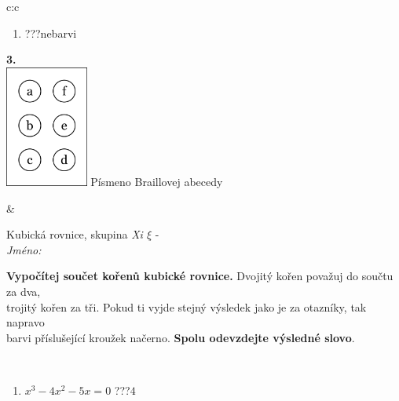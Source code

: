 \documentclass[10pt]{report}
\begin{document}
\begin{tabular}{c:c}
\begin{minipage}[c][104.5mm][t]{0.5\linewidth}
\begin{center}
\begin{minipage}{0.79\linewidth}
\begin{center}
\begin{varwidth}{\linewidth}
\begin{enumerate}
\item \quad \dotfill\; ???\;\dotfill \quad nebarvi
\end{enumerate}
\end{varwidth}
\end{center}
\end{minipage}
\begin{minipage}{0.20\linewidth}
\begin{center}
{\Huge\bfseries 3.} \\[2mm]
\includegraphics[height=40mm]{../images/braille.png}
{\small Písmeno Braillovej abecedy}
\end{center}
\end{minipage}
\end{center}
\end{minipage}
&
\begin{minipage}[c][104.5mm][t]{0.5\linewidth}
\begin{center}
\vspace{7mm}
{\huge Kubická rovnice, skupina \textit{Xi $\xi$} -}\\[5mm]
\textit{Jméno:}\phantom{xxxxxxxxxxxxxxxxxxxxxxxxxxxxxxxxxxxxxxxxxxxxxxxxxxxxxxxxxxxxxxxxx}\\[5mm]
\begin{minipage}{0.95\linewidth}
\begin{center}
\textbf{Vypočítej součet kořenů kubické rovnice.} Dvojitý kořen považuj do součtu za dva,\\trojitý kořen za tři. Pokud ti vyjde stejný výsledek jako je za otazníky, tak napravo\\barvi příslušející kroužek načerno. \textbf{Spolu odevzdejte výsledné slovo}.
\end{center}
\end{minipage}
\\[1mm]
\begin{minipage}{0.79\linewidth}
\begin{center}
\begin{varwidth}{\linewidth}
\begin{enumerate}
\Large
\item $x^3-4x^2-5x=0$\quad \dotfill\; ???\;\dotfill \quad $4$

\end{enumerate}
\end{varwidth}
\end{center}
\end{minipage}
\end{center}
\end{minipage}
\end{tabular}
\end{document}

